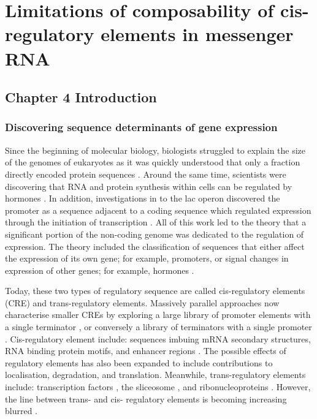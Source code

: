 \documentclass[../main.tex]{subfiles}
\begin{document}
\chapter{{Limitations} of composability of cis-regulatory elements in messenger RNA}

\section{Chapter 4 Introduction}

\subsection{Discovering sequence determinants of gene expression}

Since the beginning of molecular biology, biologists struggled to explain the size of the genomes of eukaryotes as it was quickly understood that only a fraction directly encoded protein sequences \parencite{MIRSKY1951, Thomas1971}. 
Around the same time, scientists were discovering that RNA and protein synthesis within cells can be regulated by hormones \parencite{Ui1963}.
In addition, investigations in to the lac operon discovered the promoter as a sequence adjacent to a coding sequence which regulated expression through the initiation of transcription \parencite{JACOB1964}.
All of this work led to the theory that a significant portion of the non-coding genome was dedicated to the regulation of expression. 
The theory included the classification of sequences that either affect the expression of its own gene; for example, promoters, or signal changes in expression of other genes; for example, hormones \parencite{Britten1969}. 

Today, these two types of regulatory sequence are called cis-regulatory elements (CRE) and trans-regulatory elements.
Massively parallel approaches now characterise smaller CREs by exploring a large library of promoter elements with a single terminator \parencite{Sharon2012}, or conversely a library of terminators with a single promoter \parencite{Shalem2015}.
Cis-regulatory element include: sequences imbuing mRNA secondary structures, RNA binding protein motifs, and enhancer regions \parencite{Li2015}. 
The possible effects of regulatory elements has also been expanded to include contributions to localisation, degradation, and translation.
Meanwhile, trans-regulatory elements include: transcription factors \parencite{Spitz2012}, the sliceosome \parencite{Will2011}, and ribonucleoproteins \parencite{Bleichert2010}.
However, the line between trans- and cis- regulatory elements is becoming increasing blurred \parencite{Savarese2006}.
\end{document}
